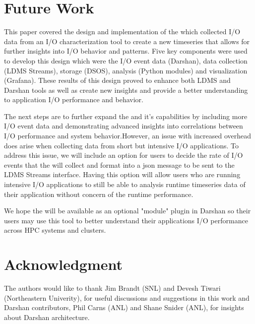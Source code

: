 \section{Future Work}
\label{sec:conclusion}
This paper covered the \Darshan{} design and implementation of the \connector{} which collected I/O data from an I/O characterization tool to create a new timeseries that allows for further insights into I/O behavior and patterns. Five key components were used to develop this design which were the I/O event data (Darshan), data collection (LDMS Streams), storage (DSOS), analysis (Python modules) and visualization (Grafana).
These results of this design proved to enhance both LDMS and Darshan tools as well as create new insights and provide a better understanding to application I/O performance and behavior. 

The next steps are to further expand the \connector{} and it's capabilities by including more I/O event data and demonstrating advanced insights into correlations between I/O performance and system behavior.However, an issue with increased overhead does arise when collecting data from short but intensive I/O applications. 
To address this issue, we will include an option for users to decide the rate of I/O events that the \connector{} will collect and format into a json message to be sent to the LDMS Streams interface. Having this option will allow users who are running intensive I/O applications to still be able to analysis runtime timeseries data of their application without concern of the runtime performance. 

We hope the \Darshan{} will be available as an optional "module" plugin in Darshan so their users may use this tool to better understand their applications I/O performance across HPC systems and clusters. 

\section{Acknowledgment}
The authors would like to thank Jim Brandt (SNL) and Devesh Tiwari (Northeastern Univerity), for useful discussions and suggestions in this work and Darshan contributors, Phil Carns (ANL) and Shane Snider (ANL), for insights about Darshan architecture.


